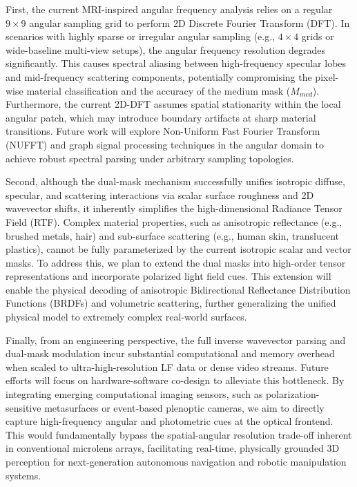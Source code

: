 \documentclass[journal]{IEEEtran}
\begin{document}
First, the current MRI-inspired angular frequency analysis relies on a regular $9 \times 9$ angular sampling grid to perform 2D Discrete Fourier Transform (DFT). In scenarios with highly sparse or irregular angular sampling (e.g., $4 \times 4$ grids or wide-baseline multi-view setups), the angular frequency resolution degrades significantly. This causes spectral aliasing between high-frequency specular lobes and mid-frequency scattering components, potentially compromising the pixel-wise material classification and the accuracy of the medium mask ($M_{med}$). Furthermore, the current 2D-DFT assumes spatial stationarity within the local angular patch, which may introduce boundary artifacts at sharp material transitions. Future work will explore Non-Uniform Fast Fourier Transform (NUFFT) and graph signal processing techniques in the angular domain to achieve robust spectral parsing under arbitrary sampling topologies.

Second, although the dual-mask mechanism successfully unifies isotropic diffuse, specular, and scattering interactions via scalar surface roughness and 2D wavevector shifts, it inherently simplifies the high-dimensional Radiance Tensor Field (RTF). Complex material properties, such as anisotropic reflectance (e.g., brushed metals, hair) and sub-surface scattering (e.g., human skin, translucent plastics), cannot be fully parameterized by the current isotropic scalar and vector masks. To address this, we plan to extend the dual masks into high-order tensor representations and incorporate polarized light field cues. This extension will enable the physical decoding of anisotropic Bidirectional Reflectance Distribution Functions (BRDFs) and volumetric scattering, further generalizing the unified physical model to extremely complex real-world surfaces.

Finally, from an engineering perspective, the full inverse wavevector parsing and dual-mask modulation incur substantial computational and memory overhead when scaled to ultra-high-resolution LF data or dense video streams. Future efforts will focus on hardware-software co-design to alleviate this bottleneck. By integrating emerging computational imaging sensors, such as polarization-sensitive metasurfaces or event-based plenoptic cameras, we aim to directly capture high-frequency angular and photometric cues at the optical frontend. This would fundamentally bypass the spatial-angular resolution trade-off inherent in conventional microlens arrays, facilitating real-time, physically grounded 3D perception for next-generation autonomous navigation and robotic manipulation systems.



\end{document}
